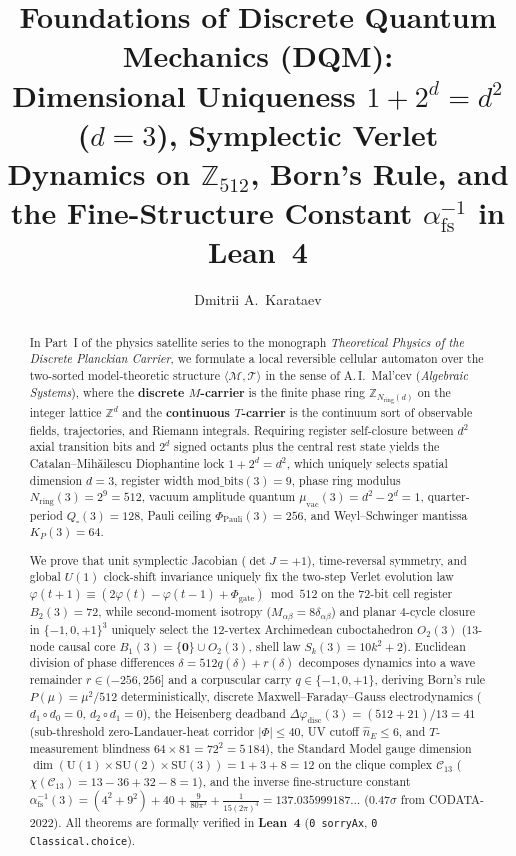 \documentclass[11pt,a4paper]{article}
\title{\textbf{Foundations of Discrete Quantum Mechanics (DQM):\\ Dimensional Uniqueness $1 + 2^d = d^2$ ($d = 3$), Symplectic Verlet Dynamics on $\mathbb{Z}_{512}$, Born's Rule, and the Fine-Structure Constant $\alpha_{\mathrm{fs}}^{-1}$ in Lean~4}}
\author{Dmitrii A.~Karataev}
\date{}
\theoremstyle{plain}
\theoremstyle{definition}
\begin{document}
\maketitle

\begin{abstract}
In Part~I of the physics satellite series to the monograph \emph{Theoretical Physics of the Discrete Planckian Carrier}, we formulate a local reversible cellular automaton over the two-sorted model-theoretic structure $\langle\mathcal{M},\mathcal{T}\rangle$ in the sense of A.\,I.~Mal'cev (\emph{Algebraic Systems}), where the \textbf{discrete $M$-carrier} is the finite phase ring $\mathbb{Z}_{N_{\mathrm{ring}}(d)}$ on the integer lattice $\mathbb{Z}^d$ and the \textbf{continuous $T$-carrier} is the continuum sort of observable fields, trajectories, and Riemann integrals. Requiring register self-closure between $d^2$ axial transition bits and $2^d$ signed octants plus the central rest state yields the Catalan--Mih\u{a}ilescu Diophantine lock $1 + 2^d = d^2$, which uniquely selects spatial dimension $d = 3$, register width $\mathrm{mod\_bits}(3) = 9$, phase ring modulus $N_{\mathrm{ring}}(3) = 2^9 = 512$, vacuum amplitude quantum $\mu_{\mathrm{vac}}(3) = d^2 - 2^d = 1$, quarter-period $Q_\square(3) = 128$, Pauli ceiling $\Phi_{\mathrm{Pauli}}(3) = 256$, and Weyl--Schwinger mantissa $K_P(3) = 64$.

We prove that unit symplectic Jacobian ($\det J = +1$), time-reversal symmetry, and global $U(1)$ clock-shift invariance uniquely fix the two-step Verlet evolution law $\varphi(t+1)\equiv (2\varphi(t)-\varphi(t-1)+\Phi_{\mathrm{gate}})\bmod 512$ on the $72$-bit cell register $B_2(3) = 72$, while second-moment isotropy ($M_{\alpha\beta} = 8\delta_{\alpha\beta}$) and planar $4$-cycle closure in $\{-1,0,+1\}^3$ uniquely select the $12$-vertex Archimedean cuboctahedron $O_2(3)$ ($13$-node causal core $B_1(3) = \{\mathbf{0}\}\cup O_2(3)$, shell law $S_k(3) = 10k^2 + 2$). Euclidean division of phase differences $\delta = 512 q(\delta) + r(\delta)$ decomposes dynamics into a wave remainder $r\in(-256,256]$ and a corpuscular carry $q\in\{-1,0,+1\}$, deriving Born's rule $P(\mu) = \mu^2/512$ deterministically, discrete Maxwell--Faraday--Gauss electrodynamics ($d_1\circ d_0 = 0$, $d_2\circ d_1 = 0$), the Heisenberg deadband $\Delta\varphi_{\mathrm{disc}}(3) = (512+21)/13 = 41$ (sub-threshold zero-Landauer-heat corridor $|\Phi|\le 40$, UV cutoff $\hat{n}_E\le 6$, and $T$-measurement blindness $64\times 81 = 72^2 = 5\,184$), the Standard Model gauge dimension $\dim(\mathrm{U}(1)\times\mathrm{SU}(2)\times\mathrm{SU}(3)) = 1+3+8 = 12$ on the clique complex $\mathcal{C}_{13}$ ($\chi(\mathcal{C}_{13}) = 13-36+32-8 = 1$), and the inverse fine-structure constant $\alpha_{\mathrm{fs}}^{-1}(3) = (4^2+9^2) + 40 + \frac{9}{80\pi^3} + \frac{1}{15(2\pi)^4} = 137.035999187\dots$ ($0.47\sigma$ from CODATA-2022). All theorems are formally verified in \textbf{Lean~4} (\texttt{0 sorryAx}, \texttt{0 Classical.choice}).


\end{abstract}
\end{document}
